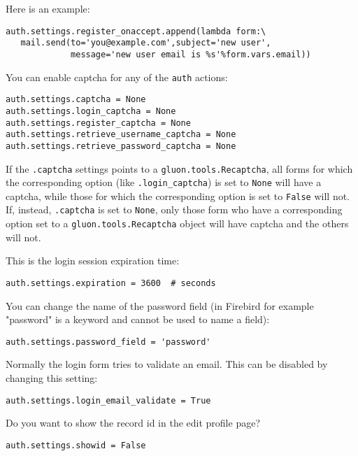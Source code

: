 \documentclass[justified,sixbynine,notoc]{tufte-book}
\def\ft{\small\tt}
\begin{document}
\begin{fullwidth}
Here is an example:

\begin{lstlisting}
auth.settings.register_onaccept.append(lambda form:\
   mail.send(to='you@example.com',subject='new user',
             message='new user email is %s'%form.vars.email))
\end{lstlisting}

You can enable captcha for any of the {\ft auth} actions:

\begin{lstlisting}
auth.settings.captcha = None
auth.settings.login_captcha = None
auth.settings.register_captcha = None
auth.settings.retrieve_username_captcha = None
auth.settings.retrieve_password_captcha = None
\end{lstlisting}

If the {\ft .captcha} settings points to a {\ft gluon.tools.Recaptcha}, all forms for which the corresponding option (like {\ft .login\_captcha}) is set to {\ft None} will have a captcha, while those for which the corresponding option is set to {\ft False} will not. If, instead, {\ft .captcha} is set to {\ft None}, only those form who have a corresponding option set to a {\ft gluon.tools.Recaptcha} object will have captcha and the others will not.

This is the login session expiration time:

\begin{lstlisting}
auth.settings.expiration = 3600  # seconds
\end{lstlisting}

You can change the name of the password field (in Firebird for example "password" is a keyword and cannot be used to name a field):

\begin{lstlisting}
auth.settings.password_field = 'password'
\end{lstlisting}

Normally the login form tries to validate an email. This can be disabled by changing this setting:

\begin{lstlisting}
auth.settings.login_email_validate = True
\end{lstlisting}

Do you want to show the record id in the edit profile page?

\begin{lstlisting}
auth.settings.showid = False
\end{lstlisting}


\end{fullwidth}
\end{document}
